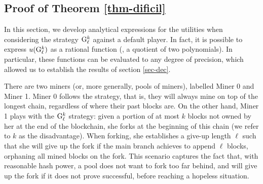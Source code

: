 
\subsection{Proof of Theorem \ref{thm-dificil}}

\label{sec-evaluation-G}
In this section, we develop analytical expressions for the utilities when considering the strategy ${\rm {G}}^k_\ell$ against a default player. In fact, it is possible to express $u({\rm {G}}^k_\ell)$ as a rational function (\ie, a quotient of two polynomials). In particular, these functions can be evaluated to any degree of precision, which allowed us to establish the results of section \ref{sec-dec}.


There are two miners (or, more generally, pools of miners), labelled Miner 0 and Miner 1. Miner 0 follows the \cdf{} strategy, that is, they will always mine on top of the longest chain, regardless of where their past blocks are. On the other hand, Miner 1 plays with the ${\rm {G}}^k_\ell$ strategy: given a portion of at most $k$ blocks not owned by her at the end of the blockchain, she forks at the beginning of this chain (we refer to $k$ as the disadvantage). When forking, she establishes a give-up length $\ell$ such that she will give up the fork if the main branch achieves to append $\ell$ blocks, orphaning all mined blocks on the fork. This scenario captures the fact that, with reasonable hash power, a pool does not want to fork too far behind, and will give up the fork if it does not prove successful, before reaching a hopeless situation.




